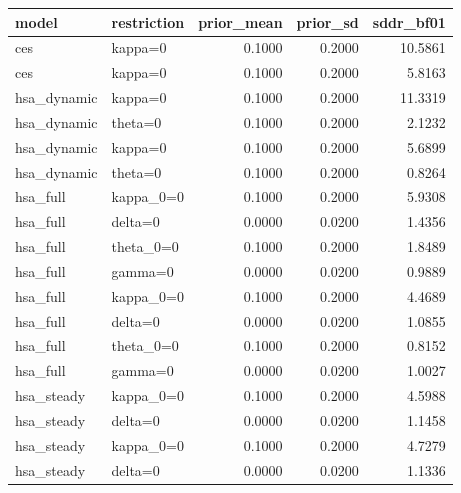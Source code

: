 \begin{tabular}{llrrr}
\toprule
model & restriction & prior\_mean & prior\_sd & sddr\_bf01 \\
\midrule
ces & kappa=0 & 0.1000 & 0.2000 & 10.5861 \\
ces & kappa=0 & 0.1000 & 0.2000 & 5.8163 \\
hsa\_dynamic & kappa=0 & 0.1000 & 0.2000 & 11.3319 \\
hsa\_dynamic & theta=0 & 0.1000 & 0.2000 & 2.1232 \\
hsa\_dynamic & kappa=0 & 0.1000 & 0.2000 & 5.6899 \\
hsa\_dynamic & theta=0 & 0.1000 & 0.2000 & 0.8264 \\
hsa\_full & kappa\_0=0 & 0.1000 & 0.2000 & 5.9308 \\
hsa\_full & delta=0 & 0.0000 & 0.0200 & 1.4356 \\
hsa\_full & theta\_0=0 & 0.1000 & 0.2000 & 1.8489 \\
hsa\_full & gamma=0 & 0.0000 & 0.0200 & 0.9889 \\
hsa\_full & kappa\_0=0 & 0.1000 & 0.2000 & 4.4689 \\
hsa\_full & delta=0 & 0.0000 & 0.0200 & 1.0855 \\
hsa\_full & theta\_0=0 & 0.1000 & 0.2000 & 0.8152 \\
hsa\_full & gamma=0 & 0.0000 & 0.0200 & 1.0027 \\
hsa\_steady & kappa\_0=0 & 0.1000 & 0.2000 & 4.5988 \\
hsa\_steady & delta=0 & 0.0000 & 0.0200 & 1.1458 \\
hsa\_steady & kappa\_0=0 & 0.1000 & 0.2000 & 4.7279 \\
hsa\_steady & delta=0 & 0.0000 & 0.0200 & 1.1336 \\
\bottomrule
\end{tabular}
